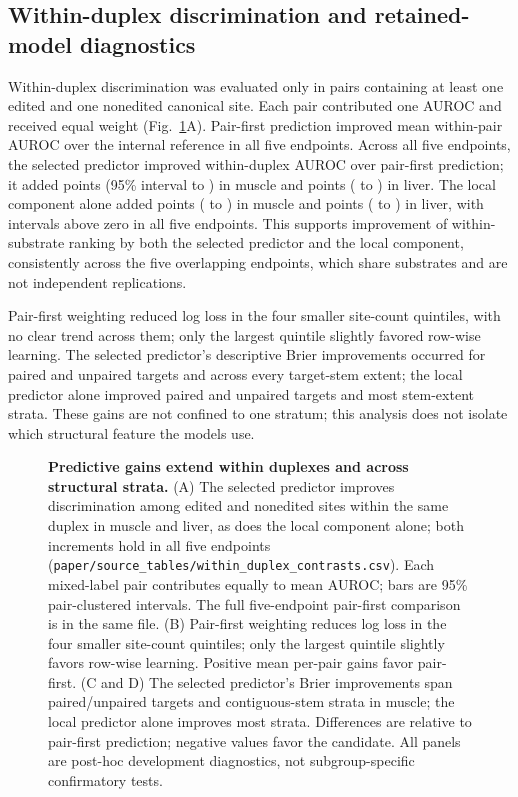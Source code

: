 \documentclass[9pt,twoside]{pnas-new}
\begin{document}
\subsection*{Within-duplex discrimination and retained-model diagnostics}

Within-duplex discrimination was evaluated only in pairs containing at least one edited and one nonedited canonical site. Each pair contributed one AUROC and received equal weight (Fig.~\ref{fig:s8_diagnostics}A). Pair-first prediction improved mean within-pair AUROC over the internal reference in all five endpoints. Across all five endpoints, the selected predictor improved within-duplex AUROC over pair-first prediction; it added \MuscleWithinEnsembleMean{} points (95\% interval \MuscleWithinEnsembleLower{} to \MuscleWithinEnsembleUpper{}) in muscle and \LiverWithinEnsembleMean{} points (\LiverWithinEnsembleLower{} to \LiverWithinEnsembleUpper{}) in liver. The local component alone added \MuscleWithinLocalMean{} points (\MuscleWithinLocalLower{} to \MuscleWithinLocalUpper{}) in muscle and \LiverWithinLocalMean{} points (\LiverWithinLocalLower{} to \LiverWithinLocalUpper{}) in liver, with intervals above zero in all five endpoints. This supports improvement of within-substrate ranking by both the selected predictor and the local component, consistently across the five overlapping endpoints, which share substrates and are not independent replications.

Pair-first weighting reduced log loss in the four smaller site-count quintiles, with no clear trend across them; only the largest quintile slightly favored row-wise learning. The selected predictor's descriptive Brier improvements occurred for paired and unpaired targets and across every target-stem extent; the local predictor alone improved paired and unpaired targets and most stem-extent strata. These gains are not confined to one stratum; this analysis does not isolate which structural feature the models use.

\begin{figure}[t!]
\centering

\caption{\textbf{Predictive gains extend within duplexes and across structural strata.} (A) The selected predictor improves discrimination among edited and nonedited sites within the same duplex in muscle and liver, as does the local component alone; both increments hold in all five endpoints (\texttt{paper/source\_tables/within\_duplex\_contrasts.csv}). Each mixed-label pair contributes equally to mean AUROC; bars are 95\% pair-clustered intervals. The full five-endpoint pair-first comparison is in the same file. (B) Pair-first weighting reduces log loss in the four smaller site-count quintiles; only the largest quintile slightly favors row-wise learning. Positive mean per-pair gains favor pair-first. (C and D) The selected predictor's Brier improvements span paired/unpaired targets and contiguous-stem strata in muscle; the local predictor alone improves most strata. Differences are relative to pair-first prediction; negative values favor the candidate. All panels are post-hoc development diagnostics, not subgroup-specific confirmatory tests.}
\label{fig:s8_diagnostics}
\end{figure}
\end{document}
